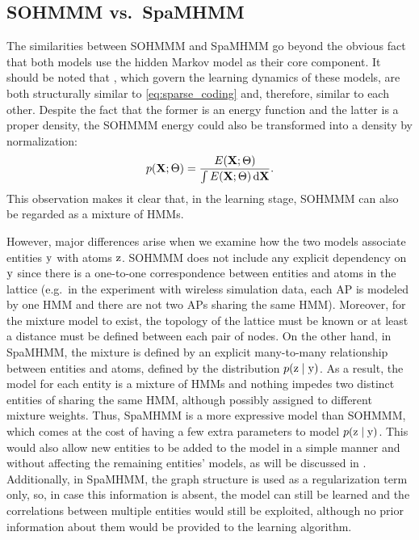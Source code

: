 \subsection{SOHMMM vs.\ SpaMHMM}
The similarities between SOHMMM and SpaMHMM go beyond the obvious fact that both models use the hidden Markov model as their core component. It should be noted that , which govern the learning dynamics of these models, are both structurally similar to \eqref{eq:sparse_coding} and, therefore, similar to each other. Despite the fact that the former is an energy function and the latter is a proper density, the SOHMMM energy  could also be transformed into a density by normalization:
\begin{equation}
    \label{eq:sohmmm_normalized}
    p({\mathbf{X}}; \Theta) = \frac{E({\mathbf{X}}; \Theta)}{\int E({\mathbf{X}}; \Theta) {\,\text{d}}{\mathbf{X}}}.
\end{equation}
This observation makes it clear that, in the learning stage, SOHMMM can also be regarded as a mixture of HMMs.

However, major differences arise when we examine how the two models associate entities ${\textnormal{y}}$ with atoms ${\textnormal{z}}$. SOHMMM does not include any explicit dependency on ${\textnormal{y}}$ since there is a one-to-one correspondence between entities and atoms in the lattice (e.g.\ in the experiment with wireless simulation data, each AP is modeled by one HMM and there are not two APs sharing the same HMM). Moreover, for the mixture model to exist, the topology of the lattice must be known or at least a distance must be defined between each pair of nodes. On the other hand, in SpaMHMM, the mixture is defined by an explicit many-to-many relationship between entities and atoms, defined by the distribution $p({\textnormal{z}} \mid {\textnormal{y}})$. As a result, the model for each entity is a mixture of HMMs and nothing impedes two distinct entities of sharing the same HMM, although possibly assigned to different mixture weights. Thus, SpaMHMM is a more expressive model than SOHMMM, which comes at the cost of having a few extra parameters to model $p({\textnormal{z}} \mid {\textnormal{y}})$. This would also allow new entities to be added to the model in a simple manner and without affecting the remaining entities' models, as will be discussed in . Additionally, in SpaMHMM, the graph structure is used as a regularization term only, so, in case this information is absent, the model can still be learned and the correlations between multiple entities would still be exploited, although no prior information about them would be provided to the learning algorithm.


